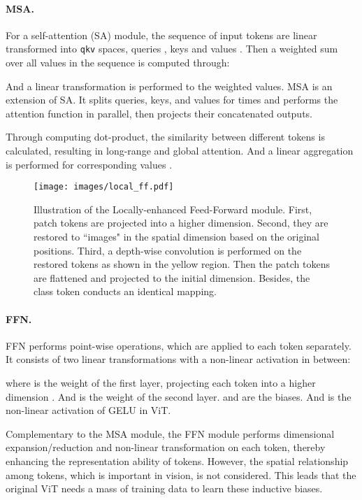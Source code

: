 \documentclass[10pt,twocolumn,letterpaper]{article}
\begin{document}
\paragraph{MSA.} For a self-attention (SA) module, the sequence of input tokens  are linear transformed into \texttt{qkv} spaces,  queries , keys  and values . Then a weighted sum over all values in the sequence is computed through:

And a linear transformation is performed to the weighted values. MSA is an extension of SA. It splits queries, keys, and values for  times and performs the attention function in parallel, then projects their concatenated outputs. 

Through computing dot-product, the similarity between different tokens is calculated, resulting in long-range and global attention. And a linear aggregation is performed for corresponding values .

\begin{figure*}[t!]
  \centering
  \texttt{[image: images/local\_ff.pdf]}
  \caption{Illustration of the Locally-enhanced Feed-Forward module. First, patch tokens are projected into a higher dimension. Second, they are restored to ``images" in the spatial dimension based on the original positions. Third, a depth-wise convolution is performed on the restored tokens as shown in the yellow region. Then the patch tokens are flattened and projected to the initial dimension. Besides, the class token conducts an identical mapping.}
  \label{fig:leff}
\end{figure*}

\paragraph{FFN.} FFN performs point-wise operations, which are applied to each token separately. It consists of two linear transformations with a non-linear activation in between:

where  is the weight of the first layer, projecting each token into a higher dimension . And  is the weight of the second layer.  and  are the biases. And  is the non-linear activation of GELU \cite{DBLP:journals/corr/HendrycksG16} in ViT.

Complementary to the MSA module, the FFN module performs dimensional expansion/reduction and non-linear transformation on each token, thereby enhancing the representation ability of tokens. However, the spatial relationship among tokens, which is important in vision, is not considered. This leads that the original ViT needs a mass of training data to learn these inductive biases.
\end{document}
